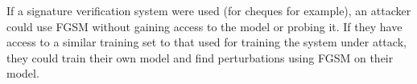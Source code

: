 If a signature verification system were used (for cheques for example), an attacker could use FGSM without gaining access to the model or probing it.
If they have access to a similar training set to that used for training the system under attack, they could train their own model and find perturbations using FGSM on their model.



